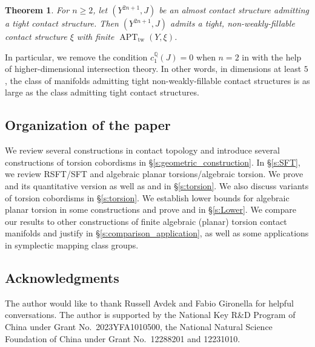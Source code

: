 \documentclass[11pt]{amsart}
\numberwithin{equation}{section}
\newtheorem{thmx}{Theorem}
\def\Q{{\mathbb Q}}
\DeclareMathOperator{\APT}{APT}
\begin{document}
\begin{thmx}\label{thm:all}
    For $n \ge 2$, let $(Y^{2n+1},J)$ be an almost contact structure admitting a tight contact structure. Then $(Y^{2n+1},J)$ admits a tight, non-weakly-fillable contact structure $\xi$ with finite $\APT_{\mathrm{tw}}(Y,\xi)$.
\end{thmx}

In particular, we remove the condition $c^{\Q}_1(J)=0$ when $n=2$ in \cite{bowden2022tight} with the help of higher-dimensional intersection theory. In other words, in dimensions at least $5$, the class of manifolds admitting tight non-weakly-fillable contact structures is as large as the class admitting tight contact structures.

\subsection*{Organization of the paper}
We review several constructions in contact topology and introduce several constructions of torsion cobordisms in \S \ref{s:geometric_construction}. In \S \ref{s:SFT}, we review RSFT/SFT and algebraic planar torsions/algebraic torsion. We prove  and its quantitative version as well as  and  in \S \ref{s:torsion}. We also discuss variants of torsion cobordisms in \S \ref{s:torsion}. We establish lower bounds for algebraic planar torsion in some constructions and prove  and  in \S \ref{s:Lower}. We compare our results to other constructions of finite algebraic (planar) torsion contact manifolds and justify  in \S \ref{s:comparison_application}, as well as some applications in symplectic mapping class groups.

\subsection*{Acknowledgments}
The author would like to thank Russell Avdek and Fabio Gironella for helpful conversations. The author is supported by the National Key R\&D Program of China under Grant No.\ 2023YFA1010500, the National Natural Science Foundation of China under Grant No.\ 12288201 and 12231010.
\end{document}
